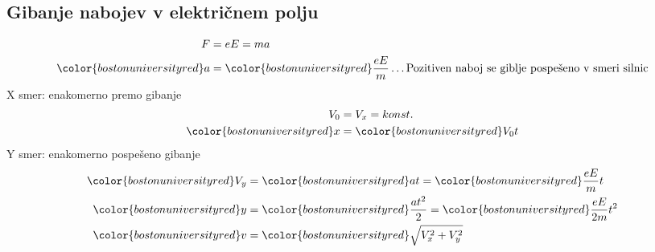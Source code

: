 {\color{indiagreen}\subsection{Gibanje nabojev v električnem polju}}
\begin{align*}
	F &= eE = ma\\
	{\color{bostonuniversityred}a} &= {\color{bostonuniversityred}\frac{eE}{m}} \dots \text{Pozitiven naboj se giblje pospešeno v smeri silnic}\\
\end{align*}
X smer: enakomerno premo gibanje
\begin{align*}
	V_0 &= V_x = konst.\\
	{\color{bostonuniversityred}x} &= {\color{bostonuniversityred}V_0 t}\\
\end{align*}
Y smer: enakomerno pospešeno gibanje
\begin{align*}
	{\color{bostonuniversityred}V_y} &= {\color{bostonuniversityred}at} = {\color{bostonuniversityred}\frac{eE}{m} t}\\
	{\color{bostonuniversityred}y} &= {\color{bostonuniversityred}\frac{at^2}{2}} = {\color{bostonuniversityred}\frac{eE}{2m} t^2}\\
	{\color{bostonuniversityred}v} &= {\color{bostonuniversityred}\sqrt{V_x^2 + V_y^2}}\\
\end{align*}